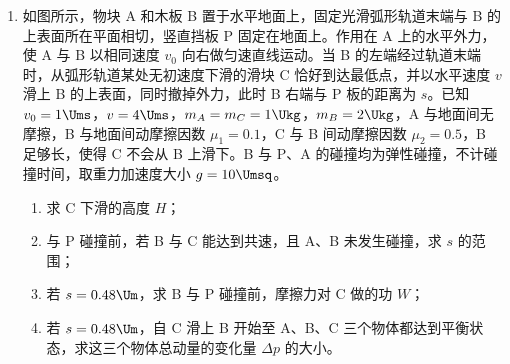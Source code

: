 \documentclass[\gkver]{gaokaozhenti}
\begin{document}
\begin{enumerate}
{联立以上各式解得 $v_{1}=15\sqrt{\frac{qEd}{m}}$，$v_{0}=9\sqrt{\frac{qEd}{m}}$

$E' = 36E$

（ii）粒子从 P 到 Q 根据动能定理有

$qE' \cdot 2d = \frac{1}{2}mv_{2}^{2} - \frac{1}{2}mv_{1}^{2}$

可得从 Q 射出时的速度为

$v_{2}=3\sqrt{41}\sqrt{\frac{qEd}{m}}$

此时粒子在磁场中的半径

$R_{2}=\frac{mv_{2}}{qB}=\frac{\sqrt{41}}{2}d$

根据其几何关系可知对应的圆心坐标为 $x = \frac{5}{2}d$，$y = 4d$

而圆心与 P 的距离为

$l=\sqrt{\left(\frac{5}{2}d-2d\right)^{2}+\left(4d-0\right)^{2}}=\frac{\sqrt{65}}{2}d\neq R_{2}$

故不会再从 P 点进入电场。
}

\item
如图所示，物块 A 和木板 B 置于水平地面上，固定光滑弧形轨道末端与 B 的上表面所在平面相切，竖直挡板 P 固定在地面上。作用在 A 上的水平外力，使 A 与 B 以相同速度 $v_{0}$ 向右做匀速直线运动。当 B 的左端经过轨道末端时，从弧形轨道某处无初速度下滑的滑块 C 恰好到达最低点，并以水平速度 $v$ 滑上 B 的上表面，同时撤掉外力，此时 B 右端与 P 板的距离为 $s$。已知 $v_{0} = 1 \Ums$，$v = 4 \Ums$，$m_{A} = m_{C} = 1 \Ukg$，$m_{B} = 2 \Ukg$，A 与地面间无摩擦，B 与地面间动摩擦因数 $\mu_{1} = 0.1$，C 与 B 间动摩擦因数 $\mu_{2} = 0.5$，B 足够长，使得 C 不会从 B 上滑下。B 与 P、A 的碰撞均为弹性碰撞，不计碰撞时间，取重力加速度大小 $g = 10 \Umsq$。
\begin{enumerate}
	\item
	求 C 下滑的高度 $H$；
	\item
	与 P 碰撞前，若 B 与 C 能达到共速，且 A、B 未发生碰撞，求 $s$ 的范围；
	\item
	若 $s = 0.48 \Um$，求 B 与 P 碰撞前，摩擦力对 C 做的功 $W$；
	\item
	若 $s = 0.48 \Um$，自 C 滑上 B 开始至 A、B、C 三个物体都达到平衡状态，求这三个物体总动量的变化量 $\Delta p$ 的大小。
\end{enumerate}



\end{enumerate}
\end{document}
